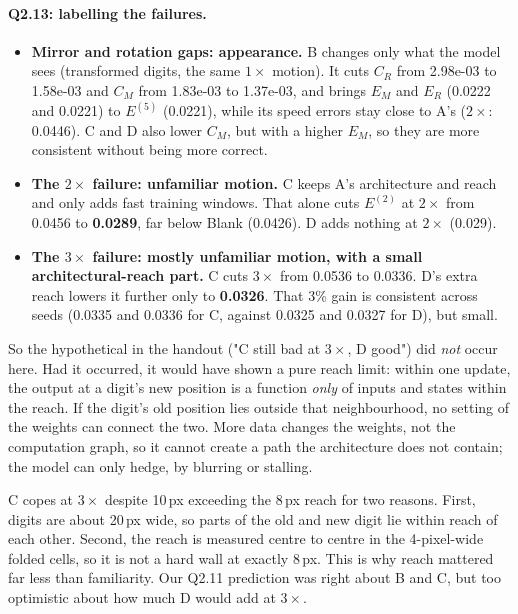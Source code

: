 \documentclass[11pt,a4paper]{article}
\begin{document}
\paragraph{Q2.13: labelling the failures.}
\begin{itemize}
  \item \textbf{Mirror and rotation gaps: appearance.} B changes only what the
        model sees (transformed digits, the same $1\times$ motion). It cuts
        $C_R$ from 2.98e-03 to 1.58e-03 and $C_M$ from 1.83e-03 to 1.37e-03,
        and brings $E_M$ and $E_R$ (0.0222 and 0.0221) to $E^{(5)}$ (0.0221),
        while its speed errors stay close to A's ($2\times$: 0.0446). C and D
        also lower $C_M$, but with a higher $E_M$, so they are more consistent
        without being more correct.
  \item \textbf{The $2\times$ failure: unfamiliar motion.} C keeps A's
        architecture and reach and only adds fast training windows. That alone
        cuts $E^{(2)}$ at $2\times$ from 0.0456 to \textbf{0.0289}, far below
        Blank (0.0426). D adds nothing at $2\times$ (0.029).
  \item \textbf{The $3\times$ failure: mostly unfamiliar motion, with a small
        architectural-reach part.} C cuts $3\times$ from 0.0536 to 0.0336. D's
        extra reach lowers it further only to \textbf{0.0326}. That 3\% gain is
        consistent across seeds (0.0335 and 0.0336 for C, against 0.0325 and
        0.0327 for D), but small.
\end{itemize}
So the hypothetical in the handout ("C still bad at $3\times$, D good") did
\emph{not} occur here. Had it occurred, it would have shown a pure reach
limit: within one update, the output at a digit's new position is a function
\emph{only} of inputs and states within the reach. If the digit's old position
lies outside that neighbourhood, no setting of the weights can connect the
two. More data changes the weights, not the computation graph, so it cannot
create a path the architecture does not contain; the model can only hedge, by
blurring or stalling.

C copes at $3\times$ despite 10\,px exceeding the 8\,px reach for two reasons.
First, digits are about 20\,px wide, so parts of the old and new digit lie
within reach of each other. Second, the reach is measured centre to centre in
the 4-pixel-wide folded cells, so it is not a hard wall at exactly 8\,px. This
is why reach mattered far less than familiarity. Our Q2.11 prediction was
right about B and C, but too optimistic about how much D would add at
$3\times$.
\end{document}
